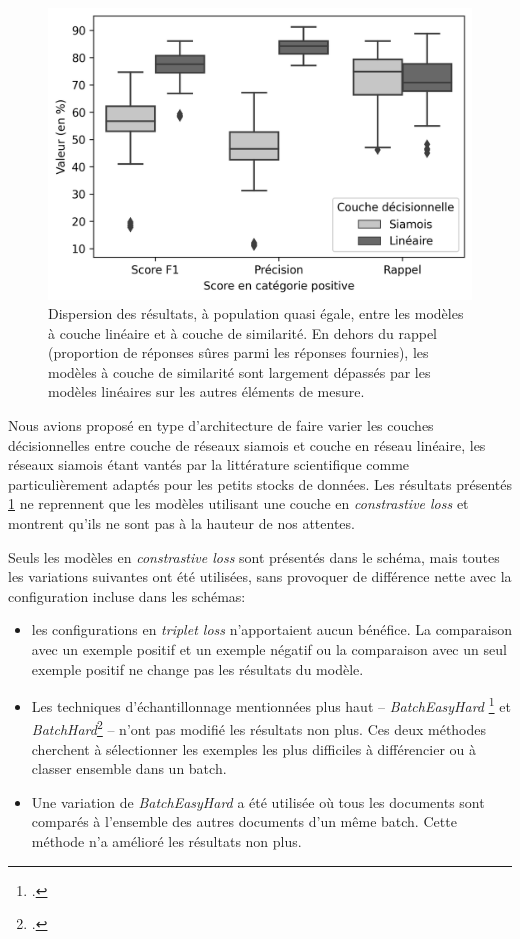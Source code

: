\begin{figure}[p]
    \centering
    \includegraphics{figures/chap4/SiameseVsLinear.png}
    \caption{Dispersion des résultats, à population quasi égale, entre les modèles à couche linéaire et à couche de similarité. En dehors du rappel (proportion de réponses sûres parmi les réponses fournies), les modèles à couche de similarité sont largement dépassés par les modèles linéaires sur les autres éléments de mesure.}
    \label{fig:chap4:modeles-siamois-vs-lineaires}
\end{figure}

Nous avions proposé en type d'architecture de faire varier les couches décisionnelles entre couche de réseaux siamois et couche en réseau linéaire, les réseaux siamois étant vantés par la littérature scientifique comme particulièrement adaptés pour les petits stocks de données. Les résultats présentés \ref{fig:chap4:modeles-siamois-vs-lineaires} ne reprennent que les modèles utilisant une couche en \textit{constrastive loss} et montrent qu'ils ne sont pas à la hauteur de nos attentes.

Seuls les modèles en \textit{constrastive loss} sont présentés dans le schéma, mais toutes les variations suivantes ont été utilisées, sans provoquer de différence nette avec la configuration incluse dans les schémas:
\begin{itemize}
    \item les configurations en \textit{triplet loss} n'apportaient aucun bénéfice. La comparaison avec un exemple positif et un exemple négatif ou la comparaison avec un seul exemple positif ne change pas les résultats du modèle.
    \item Les techniques d'échantillonnage mentionnées plus haut -- \textit{BatchEasyHard} \footcite{xuan_improved_2020} et \textit{BatchHard}\footcite{hermans_defense_2017} -- n'ont pas modifié les résultats non plus. Ces deux méthodes cherchent à sélectionner les exemples les plus difficiles à différencier ou à classer ensemble dans un batch.
    \item Une variation de \textit{BatchEasyHard} a été utilisée où tous les documents sont comparés à l'ensemble des autres documents d'un même batch. Cette méthode n'a amélioré les résultats non plus.
\end{itemize}

